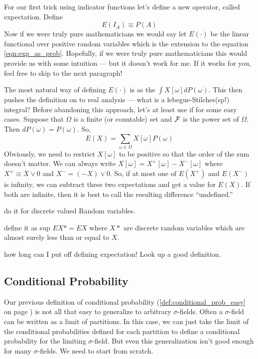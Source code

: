 \documentclass[14pt]{extarticle}
\newcommand{\notes}{}
\begin{document}
For our first trick using indicator functions let's define a new
operator, called expectation.  Define 
\begin{equation}
\label{eqn:exp_as_prob}      
E(I_A) \equiv P(A)
\end{equation}
Now if we were truly pure mathematicians we would say let
$E(\cdot)$ be the linear functional over positive random variables
which is the extension to the equation \ref{eqn:exp_as_prob}.
Hopefully, if we were truly pure mathematicians this would provide
us with some intuition --- but it doesn't work for me.  If it works for
you, feel free to skip to the next paragraph!

The most natural way of defining $E(\cdot)$ is as the $\int
X[\omega] dP(\omega)$.  This then pushes the definition on to real
analysis --- what is a lebegue-Stilches(sp!) integral?  Before abandoning
this approach, let's at least use if for some easy cases.  Suppose that
$\Omega$ is a finite (or countable) set and ${\cal F}$ is the power
set of $\Omega$.  Then $dP(\omega) = P(\omega)$. So,
\begin{displaymath}
E(X) = \sum_{\omega \in \Omega} X[\omega] P(\omega)
\end{displaymath}
Obviously, we need to restrict $X[\omega]$ to be positive so that
the order of the sum doesn't matter.  We can always write $X[\omega]
= X^+[\omega] - X^-[\omega]$ where $X^+ \equiv X \vee 0$ and
$X^- = (-X) \vee 0$.  So, if at most one of $E(X^+)$ and $E(X^-)$
is infinity, we can subtract these two expectations and get a value
for $E(X)$.  If both are infinite, then it is best to call the
resulting difference ``undefined.''

{\notes do it for discrete valued Random variables.

define it as sup $EX* = EX$ where $X*$ are discrete random variables
which are almost surely less than or equal to $X$.}

{\notes how long can I put off defining expectation!  Look up a good
  definition.}
 
        \subsection{Conditional Probability}
 
%
Our previous definition of conditional probability
(\ref{def:conditional_prob_easy} on page
\pageref{def:conditional_prob_easy}) is not all that easy to
generalize to arbitrary $\sigma$-fields.  Often a $\sigma$-field
can be written as a limit of partitions.  In this case, we can just
take the limit of the conditional probabilities defined for each
partition to define a conditional probability for the limiting
$\sigma$-field.  But even this generalization isn't good enough for
many $\sigma$-fields.  We need to start from scratch.
\end{document}
